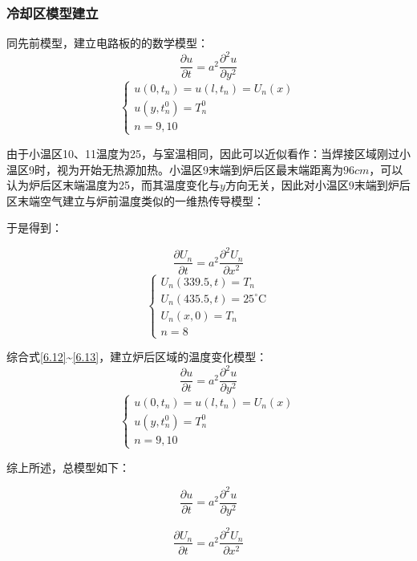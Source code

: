 \documentclass[withoutpreface,bwprint]{cumcmthesis} %
\numberwithin{equation}{subsection}
\begin{document}
\subsubsection{冷却区模型建立}
同先前模型，建立电路板的的数学模型：
$$
\frac{\partial u}{\partial t}=a^{2} \frac{\partial^{2} u}{\partial y^{2}}
$$
\begin{equation}
	\left\{\begin{array}{l}
	u\left(0, t_{n}\right)=u\left(l, t_{n}\right)=U_{n}(x) \\
	u\left(y, t_{n}^{0}\right)=T_{n}^{0} \\
	n=9,10
	\end{array}\right.
	\label{6.12}
\end{equation}

由于小温区10、11温度为25\textcelsius，与室温相同，因此可以近似看作：当焊接区域刚过小温区9时，视为开始无热源加热。小温区9末端到炉后区最末端距离为$96cm$，可以认为炉后区末端温度为25\textcelsius，而其温度变化与$y$方向无关，因此对小温区9末端到炉后区末端空气建立与炉前温度类似的一维热传导模型：

于是得到：

$$
\frac{\partial U_{n}}{\partial t}=a^{2} \frac{\partial^{2} U_{n}}{\partial x^{2}}
$$
\begin{equation}
	\left\{\begin{array}{l}
	U_{n}(339.5, t)=T_{n} \\
	U_{n}(435.5, t)=25^{\circ} \mathrm{C} \\
	U_{n}(x, 0)=T_{n} \\
	n=8
	\end{array}\right.
	\label{6.13}
\end{equation}

综合式\eqref{6.12}\~{}\eqref{6.13}，建立炉后区域的温度变化模型：
$$
\frac{\partial u}{\partial t}=a^{2} \frac{\partial^{2} u}{\partial y^{2}}
$$
\begin{equation}
	\left\{\begin{array}{l}
	u\left(0, t_{n}\right)=u\left(l, t_{n}\right)=U_{n}(x) \\
	u\left(y, t_{n}^{0}\right)=T_{n}^{0} \\
	n=9,10
	\end{array}\right.
	\label{6.14}
\end{equation}

综上所述，总模型如下：

$$
\frac{\partial u}{\partial t}=a^{2} \frac{\partial^{2} u}{\partial y^{2}}
$$

$$
\frac{\partial U_{n}}{\partial t}=a^{2} \frac{\partial^{2} U_{n}}{\partial x^{2}}
$$
\end{document}
